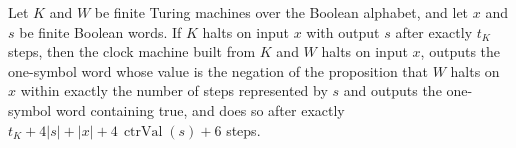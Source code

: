 \begin{theorem}
\label{Complexity.TimeHierarchy.clockTM_spec}
\leanok
{}
Let $K$ and $W$ be finite Turing machines over the Boolean alphabet, and let $x$ and $s$
be finite Boolean words. If $K$ halts on input $x$ with output $s$ after exactly $t_K$
steps, then the clock machine built from $K$ and $W$ halts on input $x$, outputs the
one-symbol word whose value is the negation of the proposition that $W$ halts on $x$
within exactly the number of steps represented by $s$ and outputs the one-symbol word
containing true, and does so after exactly $t_K+4|s|+|x|+4\,\operatorname{ctrVal}(s)+6$
steps.
\end{theorem}
